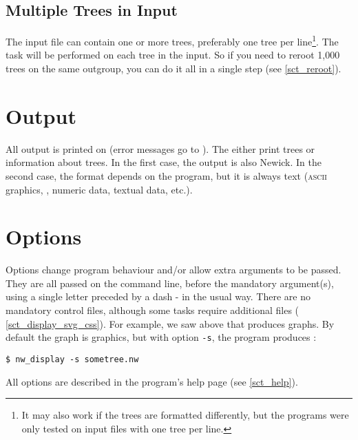 \subsection{Multiple Trees in Input}

The input file can contain one or more trees, preferably one tree per
line\footnote{It may also work if the trees are formatted differently, but the
programs were only tested on input files with one tree per line.}. The task
will be performed on each tree in the input. So if you need to reroot 1,000
trees on the same outgroup, you can do it all in a single step (see
\ref{sct_reroot}). 

\section{Output}
\label{sct_output}

All output is printed on \stdout{} (error messages go to \stderr). The \nutils{}
either print trees or information about trees. In the first case, the output is
also Newick. In the second case, the format depends on the program, but it is
always text (\textsc{ascii} graphics, \svg, numeric data, textual data, etc.).

\section{Options}
\label{sct_options}

Options change program behaviour and/or allow extra arguments to be passed.
They are all passed on the command line, before the mandatory argument(s),
using a single letter preceded by a dash - in the usual \unix{} way. There are
no mandatory control files, although some tasks require additional files (\eg{}
\ref{sct_display_svg_css}). For example, we saw above that \display{} produces
graphs. By default the graph is \ascii{} graphics, but with option \texttt{-s},
the program produces \svg:
\begin{verbatim}
$ nw_display -s sometree.nw
\end{verbatim}
All options are described in the program's help page (see \ref{sct_help}).

